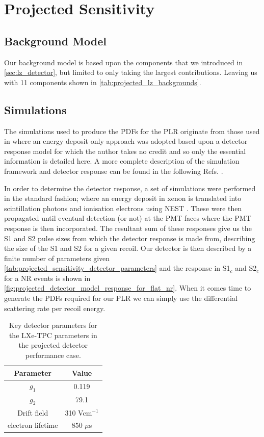 \section{Projected Sensitivity}

\subsection{Background Model}
\par
Our background model is based upon the components that we introduced in \autoref{sec:lz_detector}, but limited to only taking the largest contributions.
Leaving us with 11 components shown in \autoref{tab:projected_lz_backgrounds}.


\subsection{Simulations}
\par
The simulations used to produce the PDFs for the PLR originate from those used in \cite{LZ_projected_sensitivity_paper_ref} where an energy deposit only approach was adopted based upon a detector response model for which the author takes no credit and so only the essential information is detailed here.
A more complete description of the simulation framework and detector response can be found in the following Refs. \cite{lz_simulations_ref,theresafruth_thesis_ref}.
\par
In order to determine the detector response, a set of simulations were performed in the standard fashion; where an energy deposit in xenon is translated into scintillation photons and ionisation electrons using NEST \cite{nest_1_ref,nest_2_ref}.
These were then propagated until eventual detection (or not) at the PMT faces where the PMT response is then incorporated.
The resultant sum of these responses give us the S1 and S2 pulse sizes from which the detector response is made from, describing the size of the S1 and S2 for a given recoil.
Our detector is then described by a finite number of parameters given \autoref{tab:projected_sensitivity_detector_parameters} and the response in S1$_c$ and S2$_c$ for a NR events is shown in \autoref{fig:projected_detector_model_response_for_flat_nr}.
When it comes time to generate the PDFs required for our PLR we can simply use the differential scattering rate per recoil energy.
\begin{table}[]
    \centering
    \begin{tabular}{c|c}
        Parameter   & Value  \\ \hline
        $g_{1}$     & 0.119 \\
        $g_{2}$     & 79.1  \\
        Drift field & 310 Vcm$^{-1}$ \\
        electron lifetime & 850 $\mu$s
    \end{tabular}
    \caption{Key detector parameters for the LXe-TPC parameters in the projected detector performance case.}
    \label{tab:projected_sensitivity_detector_parameters}
\end{table}



